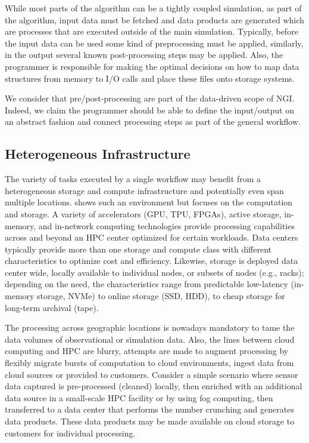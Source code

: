 \documentclass[a4paper, twocolumn]{article}
\begin{document}
While most parts of the algorithm can be a tightly coupled simulation, as part of the algorithm, input data must be fetched and data products are generated which are processes that are executed outside of the main simulation.
Typically, before the input data can be used some kind of preprocessing must be applied, similarly, in the output several known post-processing steps may be applied.
Also, the programmer is responsible for making the optimal decisions on how to map data structures from memory to I/O calls and place these files onto storage systems.

We consider that pre/post-processing are part of the data-driven scope of NGI.
Indeed, we claim the programmer should be able to define the input/output on an abstract fashion and connect processing steps as part of the general workflow.

\subsection{Heterogeneous Infrastructure}

The variety of tasks executed by a single workflow may benefit from a heterogeneous storage and compute infrastructure and potentially even span multiple locations.
 shows such an environment but focuses on the computation and storage.
A variety of accelerators (GPU, TPU, FPGAs), active storage, in-memory, and in-network computing technologies provide processing capabilities across and beyond an HPC center optimized for certain workloads.
Data centers typically provide more than one storage and compute class with different characteristics to optimize cost and efficiency.
Likewise, storage is deployed data center wide, locally available to individual nodes, or subsets of nodes (e.g., racks); depending on the need, the characteristics range from predictable low-latency (in-memory storage, NVMe) to online storage (SSD, HDD), to cheap storage for long-term archival (tape).

The processing across geographic locations is nowadays mandatory to tame the data volumes of observational or simulation data.
Also, the lines between cloud computing and HPC are blurry, attempts are made to augment processing by flexibly migrate bursts of computation to cloud environments, ingest data from cloud sources or provided to customers.
Consider a simple scenario where sensor data captured is pre-processed (cleaned) locally, then enriched with an additional data source in a small-scale HPC facility or by using fog computing, then transferred to a data center that performs the number crunching and generates data products.
These data products may be made available on cloud storage to customers for individual processing.
\end{document}
